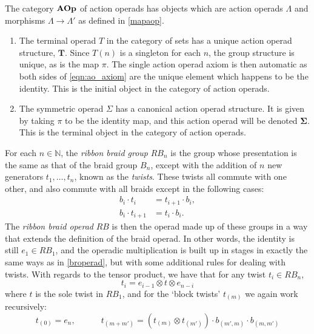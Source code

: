 \begin{Defi}\label{Defi:cat_aop}
The category $\mathbf{AOp}$ of action operads has objects which are action operads $\Lambda$ and
 morphisms $\Lambda \rightarrow \Lambda'$ as defined in \cref{mapaop}.
\end{Defi}

\begin{example}
\begin{enumerate}
\item The terminal operad $T$ in the category of sets has a unique action operad structure, $\mathbf{T}$. Since $T(n)$ is a singleton for each $n$, the group structure is unique, as is the map $\pi$. The single action operad axiom is then automatic as both sides of \cref{eqn:ao_axiom} are the unique element which happens to be the identity. This is the initial object in the category of action operads.
\item The symmetric operad $\Sigma$ has a canonical action operad structure. It is given by taking $\pi$ to be the identity map, and this action operad will be denoted $\mathbf{\Sigma}$. This is the terminal object in the category of action operads.
\end{enumerate}
\end{example}

\begin{Defi} For each $n \in \mathbb{N}$, the \emph{ribbon braid group} $RB_{n}$ is the group whose presentation is the same as that of the braid group $B_{n}$, except with the addition of $n$ new generators $t_1, \ldots, t_n$, known as the \emph{twists}. These twists all commute with one other, and also commute with all braids except in the following cases:
  \begin{align*}
    b_i \cdot t_i &= t_{i+1} \cdot b_i,\\
    b_i \cdot t_{i+1} &= t_i \cdot b_i.
  \end{align*}
The \emph{ribbon braid operad} $RB$ is then the operad made up of these groups in a way that extends the definition of the braid operad. In other words, the identity is still $e_1 \in RB_1$, and the operadic multiplication is built up in stages in exactly the same ways as in \cref{broperad}, but with some additional rules for dealing with twists. With regards to the tensor product, we have that for any twist $t_i \in RB_{n}$,
  \[
    t_i = e_{i-1} \otimes t \otimes e_{n-i}
  \]
where $t$ is the sole twist in $RB_1$, and for the `block twists' $t_{(m)}$ we again work recursively:
  \[
    t_{(0)} = e_n, \quad \quad \quad t_{(m+m')} = \left(t_{(m)} \otimes t_{(m')}\right) \cdot b_{(m', m)} \cdot b_{(m, m')}
  \]
\end{Defi}

